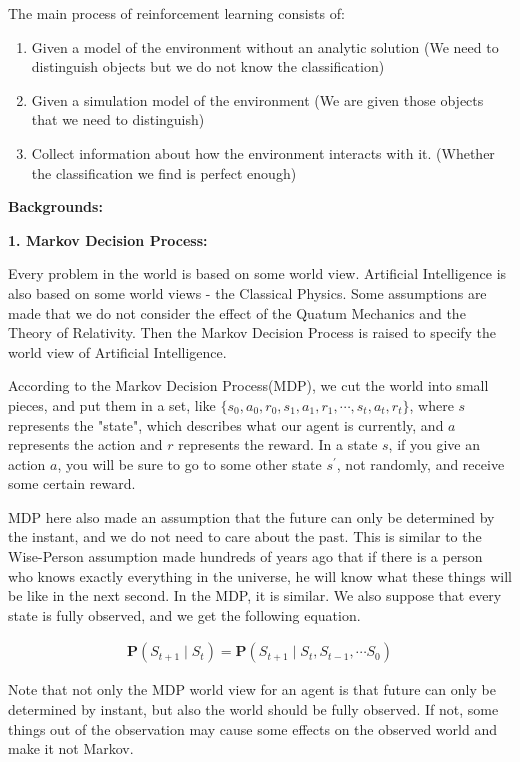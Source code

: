 \documentclass[a4paper,12pt]{article}
\begin{document}
The main process of reinforcement learning consists of:
\begin{enumerate}
\item Given a model of the environment without an analytic solution (We need to distinguish objects but we do not know the classification)
\item Given a simulation model of the environment (We are given those objects that we need to distinguish)
\item Collect information about how the environment interacts with it. (Whether the classification we find is perfect enough)
\end{enumerate}

\textbf{Backgrounds:}\cite{case4}


\textbf{1. Markov Decision Process:}

Every problem in the world is based on some world view. Artificial Intelligence is also based on some world views - the Classical Physics. Some assumptions are made that we do not consider the effect of the Quatum Mechanics and the Theory of Relativity. Then the Markov Decision Process is raised to specify the world view of Artificial Intelligence.

According to the Markov Decision Process(MDP), we cut the world into small pieces, and put them in a set, like $\lbrace s_0, a_0, r_0, s_1, a_1, r_1, \cdots, s_t, a_t, r_t\rbrace$, where $s$ represents the "state", which describes what our agent is currently, and $a$ represents the action and $r$ represents the reward. In a state $s$, if you give an action $a$, you will be sure to go to some other state $s^{'}$, not randomly, and receive some certain reward.

MDP here also made an assumption that the future can only be determined by the instant, and we do not need to care about the past. This is similar to the Wise-Person assumption made hundreds of years ago that if there is a person who knows exactly everything in the universe, he will know what these things will be like in the next second. In the MDP, it is similar. We also suppose that every state is fully observed, and we get the following equation.

\begin{align*}
\textbf{P}(S_{t+1} \mid S_t) = \textbf{P}(S_{t+1} \mid S_t, S_{t-1}, \cdots S_0)
\end{align*}

Note that not only the MDP world view for an agent is that future can only be determined by instant, but also the world should be fully observed. If not, some things out of the observation may cause some effects on the observed world and make it not Markov.
\end{document}
